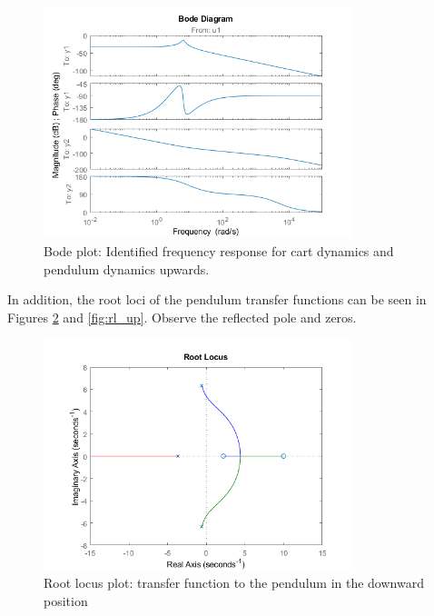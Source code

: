 \documentclass[12pt]{article}
\begin{document}
\begin{figure}[H]
    \centering
    \includegraphics[width=0.8\textwidth]{../plots/bode_up.png}
    \caption{Bode plot: Identified frequency response for cart dynamics and pendulum dynamics upwards.}
    \label{fig:bode_up}
\end{figure}

In addition, the root loci of the pendulum transfer functions can be seen in Figures \ref{fig:rl_down} and \ref{fig:rl_up}. Observe the reflected pole and zeros.
\begin{figure}[H]
    \centering
    \includegraphics[width=0.8\textwidth]{../plots/rlocus_down.png}
    \caption{Root locus plot: transfer function to the pendulum in the downward position}
    \label{fig:rl_down}
\end{figure}
\end{document}
